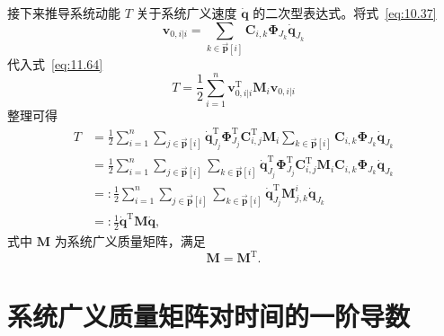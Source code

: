 接下来推导系统动能 $T$ 关于系统广义速度 $\dot{\boldsymbol{q}}$ 的二次型表达式。将式~\eqref{eq:10.37}
\begin{equation*}
\boldsymbol{v}_{0,i|i} = \sum_{k \in \vec{\boldsymbol{p}}[i]} \boldsymbol{C}_{i,k} \boldsymbol{\Phi}_{J_k} \dot{\boldsymbol{q}}_{J_k}
\end{equation*}
代入式~\eqref{eq:11.64}
\begin{equation*}
T = \frac{1}{2} \sum_{i=1}^{n} \boldsymbol{v}_{0,i|i}^{\mathrm{T}} \boldsymbol{M}_i \boldsymbol{v}_{0,i|i}
\end{equation*}
整理可得
\begin{equation}\label{eq:11.4}
\begin{aligned}
T &= \frac{1}{2} \sum_{i=1}^{n} \sum_{j \in \vec{\boldsymbol{p}}[i]} \dot{\boldsymbol{q}}_{J_j}^{\mathrm{T}} \boldsymbol{\Phi}_{J_j}^{\mathrm{T}} \boldsymbol{C}_{i,j}^{\mathrm{T}} \boldsymbol{M}_i \sum_{k \in \vec{\boldsymbol{p}}[i]} \boldsymbol{C}_{i,k} \boldsymbol{\Phi}_{J_k} \dot{\boldsymbol{q}}_{J_k} \\
  &= \frac{1}{2} \sum_{i=1}^{n} \sum_{j \in \vec{\boldsymbol{p}}[i]} \sum_{k \in \vec{\boldsymbol{p}}[i]} \dot{\boldsymbol{q}}_{J_j}^{\mathrm{T}} \boldsymbol{\Phi}_{J_j}^{\mathrm{T}} \boldsymbol{C}_{i,j}^{\mathrm{T}} \boldsymbol{M}_i \boldsymbol{C}_{i,k} \boldsymbol{\Phi}_{J_k} \dot{\boldsymbol{q}}_{J_k} \\
  &=: \frac{1}{2} \sum_{i=1}^{n} \sum_{j \in \vec{\boldsymbol{p}}[i]} \sum_{k \in \vec{\boldsymbol{p}}[i]} \dot{\boldsymbol{q}}_{J_j}^{\mathrm{T}} \boldsymbol{M}_{j,k}^{i} \dot{\boldsymbol{q}}_{J_k} \\
  &=: \frac{1}{2} \dot{\boldsymbol{q}}^{\mathrm{T}} \boldsymbol{M} \dot{\boldsymbol{q}},
\end{aligned}
\end{equation}
式中 $\boldsymbol{M}$ 为系统广义质量矩阵，满足
\begin{equation}\label{eq:11.5}
\boldsymbol{M} = \boldsymbol{M}^{\mathrm{T}}.
\end{equation}

\section{系统广义质量矩阵对时间的一阶导数}

